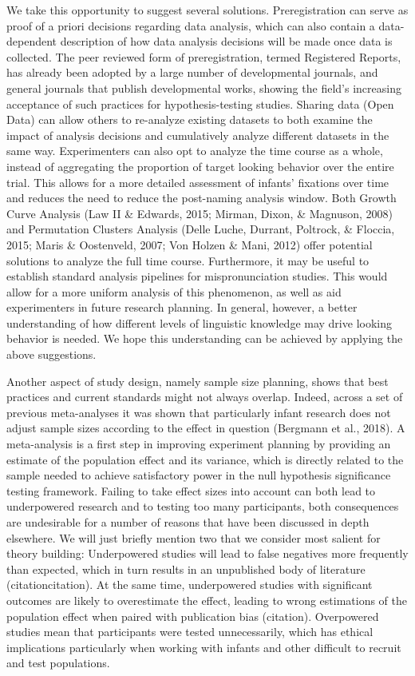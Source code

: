 \documentclass[man]{apa6}
\theoremstyle{definition}
\theoremstyle{definition}
\theoremstyle{definition}
\theoremstyle{remark}
\begin{document}
We take this opportunity to suggest several solutions. Preregistration
can serve as proof of a priori decisions regarding data analysis, which
can also contain a data-dependent description of how data analysis
decisions will be made once data is collected. The peer reviewed form of
preregistration, termed Registered Reports, has already been adopted by
a large number of developmental journals, and general journals that
publish developmental works, showing the field's increasing acceptance
of such practices for hypothesis-testing studies. Sharing data (Open
Data) can allow others to re-analyze existing datasets to both examine
the impact of analysis decisions and cumulatively analyze different
datasets in the same way. Experimenters can also opt to analyze the time
course as a whole, instead of aggregating the proportion of target
looking behavior over the entire trial. This allows for a more detailed
assessment of infants' fixations over time and reduces the need to
reduce the post-naming analysis window. Both Growth Curve Analysis (Law
II \& Edwards, 2015; Mirman, Dixon, \& Magnuson, 2008) and Permutation
Clusters Analysis (Delle Luche, Durrant, Poltrock, \& Floccia, 2015;
Maris \& Oostenveld, 2007; Von Holzen \& Mani, 2012) offer potential
solutions to analyze the full time course. Furthermore, it may be useful
to establish standard analysis pipelines for mispronunciation studies.
This would allow for a more uniform analysis of this phenomenon, as well
as aid experimenters in future research planning. In general, however, a
better understanding of how different levels of linguistic knowledge may
drive looking behavior is needed. We hope this understanding can be
achieved by applying the above suggestions.

Another aspect of study design, namely sample size planning, shows that
best practices and current standards might not always overlap. Indeed,
across a set of previous meta-analyses it was shown that particularly
infant research does not adjust sample sizes according to the effect in
question (Bergmann et al., 2018). A meta-analysis is a first step in
improving experiment planning by providing an estimate of the population
effect and its variance, which is directly related to the sample needed
to achieve satisfactory power in the null hypothesis significance
testing framework. Failing to take effect sizes into account can both
lead to underpowered research and to testing too many participants, both
consequences are undesirable for a number of reasons that have been
discussed in depth elsewhere. We will just briefly mention two that we
consider most salient for theory building: Underpowered studies will
lead to false negatives more frequently than expected, which in turn
results in an unpublished body of literature (citationcitation). At the
same time, underpowered studies with significant outcomes are likely to
overestimate the effect, leading to wrong estimations of the population
effect when paired with publication bias (citation). Overpowered studies
mean that participants were tested unnecessarily, which has ethical
implications particularly when working with infants and other difficult
to recruit and test populations.
\end{document}
